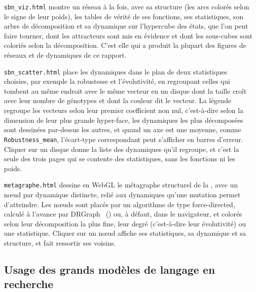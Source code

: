 \documentclass[12pt, a4paper]{article}
\begin{document}
\texttt{sbn\_viz.html} montre un réseau à la fois, avec sa structure (les arcs colorés selon le signe de leur poids), les tables de vérité de ses fonctions, ses statistiques, son arbre de décomposition et sa dynamique sur l'hypercube des états, que l'on peut faire tourner, dont les attracteurs sont mis en évidence et dont les sous-cubes sont coloriés selon la décomposition.
C'est elle qui a produit la plupart des figures de réseaux et de dynamiques de ce rapport.

\texttt{sbn\_scatter.html} place les dynamiques dans le plan de deux statistiques choisies, par exemple la robustesse et l'évolutivité, en regroupant celles qui tombent au même endroit avec le même vecteur en un disque dont la taille croît avec leur nombre de génotypes et dont la couleur dit le vecteur.
La légende regroupe les vecteurs selon leur premier coefficient non nul, c'est-à-dire selon la dimension de leur plus grande hyper-face, les dynamiques les plus décomposées sont dessinées par-dessus les autres, et quand un axe est une moyenne, comme \texttt{Robustness\_mean}, l'écart-type correspondant peut s'afficher en barres d'erreur.
Cliquer sur un disque donne la liste des dynamiques qu'il regroupe, et c'est la seule des trois pages qui se contente des statistiques, sans les fonctions ni les poids.

\texttt{metagraphe.html} dessine en WebGL le métagraphe structurel de la , avec un nœud par dynamique distincte, relié aux dynamiques qu'une mutation permet d'atteindre.
Les nœuds sont placés par un algorithme de type force-directed, calculé à l'avance par DRGraph~\cite{zhu2020} () ou, à défaut, dans le navigateur, et colorés selon leur décomposition la plus fine, leur degré (c'est-à-dire leur évolutivité) ou une statistique.
Cliquer sur un nœud affiche ses statistiques, sa dynamique et sa structure, et fait ressortir ses voisins.


\subsection{Usage des grands modèles de langage en recherche}
\end{document}
